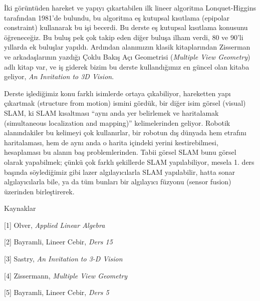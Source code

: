 \documentclass[12pt,fleqn]{article}\usepackage{../../common}
\begin{document}
İki görüntüden hareket ve yapıyı çıkartabilen ilk lineer algoritma
Lonquet-Higgins tarafından 1981'de bulundu, bu algoritma eş kutupsal
kısıtlama (epipolar constraint) kullanarak bu işi becerdi. Bu derste eş
kutupsal kısıtlama konusunu öğreneceğiz. Bu buluş pek çok takip eden diğer
buluşa ilham verdi, 80 ve 90'li yıllarda ek buluşlar yapıldı. Ardından
alanımızın klasik kitaplarından Zisserman ve arkadaşlarının yazdığı Çoklu
Bakış Açı Geometrisi ({\em Multiple View Geometry}) adlı kitap var, ve iş
giderek bizim bu derste kullandığımız en güncel olan kitaba geliyor, 
{\em An Invitation to 3D Vision}. 

Derste işlediğimiz konu farklı isimlerde ortaya çıkabiliyor, hareketten
yapı çıkartmak (structure from motion) ismini gördük, bir diğer isim görsel
(visual) SLAM, ki SLAM kısaltması ``aynı anda yer belirlemek ve haritalamak
(simultaneous localization and mapping)'' kelimelerinden geliyor. Robotik
alanındakiler bu kelimeyi çok kullanırlar, bir robotun dış dünyada hem
etrafını haritalaması, hem de aynı anda o harita içindeki yerini
kestirebilmesi, hesaplaması bu alanın baş problemlerinden. Tabii görsel
SLAM bunu görsel olarak yapabilmek; çünkü çok farklı şekillerde SLAM
yapılabiliyor, mesela 1. ders başında söylediğimiz gibi lazer
algılayıcılarla SLAM yapılabilir, hatta sonar algılayıcılarla bile, ya da
tüm bunları bir algılayıcı füzyonu (sensor fusion) üzerinden birleştirerek.


Kaynaklar 

[1] Olver, {\em Applied Linear Algebra}

[2] Bayramli, Lineer Cebir, {\em Ders 15}

[3] Sastry, {\em An Invitation to 3-D Vision}

[4] Zissermann, {\em Multiple View Geometry}

[5] Bayramli, Lineer Cebir, {\em Ders 5}
\end{document}
